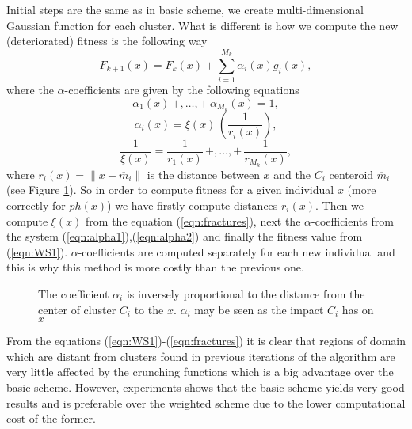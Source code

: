Initial steps are the same as in basic scheme, we create 
multi-dimensional Gaussian function for each cluster. 
What is different is how we compute the new (deteriorated) 
fitness is the following way
\begin{equation}
\label{eqn:WS1}
F_{k+1}(x) = F_k(x) + \sum_{i=1}^{M_k} \alpha_i(x) g_i(x),
\end{equation}
where the $\alpha$-coefficients are given by the following equations
\begin{equation}
\label{eqn:alpha1}
\alpha_1(x) \, +, \ldots, + \, \alpha_{M_k}(x) = 1,
\end{equation}
\begin{equation}
\label{eqn:alpha2}
\alpha_i(x) = \xi(x) \, \left( \frac{1}{r_i(x)} \right),
\end{equation}
\begin{equation}
\label{eqn:fractures}
\frac{1}{\xi(x)} = \frac{1}{r_1(x)} \, +, \ldots, + \, \frac{1}{r_{M_k}(x)},
\end{equation}
where $r_i(x) = \left\| x - \overline{m}_i \right\|$ is the distance between $x$ 
and the $C_i$ centeroid $\overline{m}_i$ (see Figure \ref{fig:weightedScheme}). 
So in order to compute fitness for a 
given individual $x$ (more correctly for $ph(x)$) 
we have firstly compute distances $r_i(x)$. 
Then we compute $\xi(x)$ from the equation (\ref{eqn:fractures}), next the
$\alpha$-coefficients from the system (\ref{eqn:alpha1}),(\ref{eqn:alpha2})
and finally the fitness value from (\ref{eqn:WS1}).
$\alpha$-coefficients are computed separately for each new individual 
and this is why this method is more costly than the previous one.
\begin{figure}
  \centering
  \caption{The coefficient $\alpha_i$ is inversely proportional to the 
  distance from the center of cluster $C_i$ to the $x$. $\alpha_i$ may
  be seen as the impact $C_i$ has on $x$}
  \label{fig:weightedScheme}
\end{figure}
From the equations (\ref{eqn:WS1})-(\ref{eqn:fractures}) 
it is clear that regions of domain
which are distant from clusters found in previous iterations of the algorithm
are very little affected by the crunching functions which is a big advantage
over the basic scheme. 
However, experiments shows that the basic
scheme yields very good results and is preferable over the weighted
scheme due to the lower computational cost of the former.



